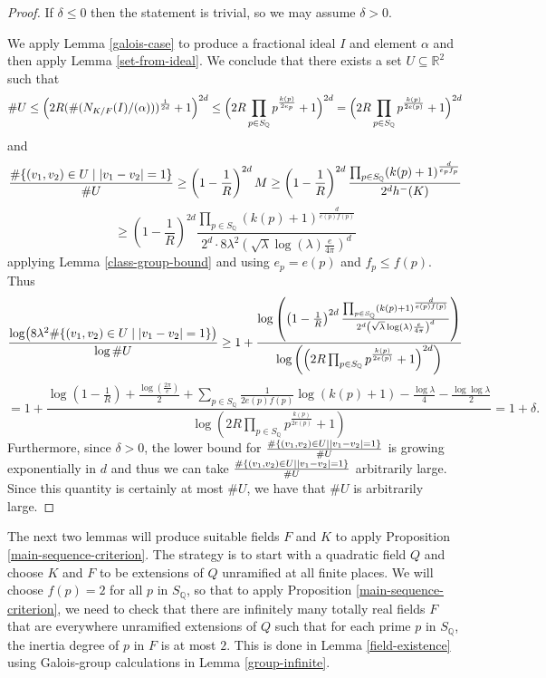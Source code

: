 \documentclass[12pt]{amsart}
\theoremstyle{remark}
\theoremstyle{definition}
\begin{document}
\begin{proof} If $\delta \leq 0$ then the statement is trivial, so we may assume $\delta>0$.

We apply Lemma \ref{galois-case} to produce a fractional ideal $I$ and element $\alpha$ and then apply Lemma \ref{set-from-ideal}. We conclude that there exists a set $U \subseteq \mathbb R^2$ such that \[\# U \leq  \left( 2R (\# (N_{K/F}(I)/(\alpha)))^{\frac{1}{2d}} +1 \right)^{2d} \leq \Bigl( 2R \prod_{p \in S_\mathbb Q} p^{\frac{k(p) }{2e_p}} +1 \Bigr)^{2d} = \Bigl( 2R \prod_{p \in S_\mathbb Q} p^{\frac{k(p) }{2e(p)}} +1 \Bigr)^{2d} \] and  \[  \frac{\# \{ (v_1,v_2) \in U \mid \abs{v_1-v_2}=1\} }{ \# U} \geq \left(1-\frac{1}{R}\right)^{2d} M  \geq \left(1-\frac{1}{R}\right)^{2d} \frac{ \prod_{ p \in S_\mathbb Q} (k(p)+1  )^{\frac{d}{ e_p f_p}}}{ 2^d h^{-}(K)} \] \[\geq \left(1-\frac{1}{R}\right)^{2d} \frac{ \prod_{ p \in S_\mathbb Q} (k(p)+1  )^{\frac{d}{ e(p) f(p)}}}{  2^d \cdot 8 \lambda^2 \left(\sqrt{\lambda  } \log(\lambda) \frac{e}{4\pi} \right)^d  }\] applying Lemma \ref{class-group-bound} and using $e_p=e(p)$ and $f_p \leq f(p)$. Thus
\[    \frac{  \log( 8\lambda^2  \# \{ (v_1,v_2) \in U \mid \abs{v_1-v_2}=1\})}{\log \#U} \geq 1 + \frac{\log\left(  \left(1-\frac{1}{R}\right)^{2d} \frac{ \prod_{ p \in S_\mathbb Q} (k(p)+1  )^{\frac{d}{ e(p) f(p)}}}{ 2^d \left(\sqrt{\lambda} \log(\lambda) \frac{e}{4\pi} \right)^d }  \right)}{\log \left( \left( 2R \prod_{p \in S_\mathbb Q} p^{\frac{k(p) }{2e(p)}} +1 \right)^{2d}\right)}\]
\[ = 1 + \frac{  \log \left(1-\frac{1}{R}\right) + \frac{\log \left(\frac{2\pi}{e} \right)}{2} +\sum_{p\in S_{\mathbb Q}} \frac{1}{2e(p)f(p) } \log (k(p)+1)  - \frac{\log \lambda}{4} - \frac{\log \log \lambda}{2} }{ \log \left( 2R \prod_{p \in S_\mathbb Q} p^{\frac{k(p) }{2e(p)}} +1 \right)} = 1+\delta.\]
Furthermore, since $\delta>0$, the lower bound for  $  \frac{\# \{ (v_1,v_2) \in U \mid \abs{v_1-v_2}=1\} }{ \# U} $ is growing exponentially in $d$ and thus we can take $  \frac{\# \{ (v_1,v_2) \in U \mid \abs{v_1-v_2}=1\} }{ \# U} $ arbitrarily large. Since this quantity is certainly at most $\#U$, we have that $\#U$ is arbitrarily large. \end{proof}


The next two lemmas will produce suitable fields $F$ and $K$ to apply Proposition \ref{main-sequence-criterion}. The strategy is to start with a quadratic field $Q$ and choose $K$ and $F$ to be extensions of $Q$ unramified at all finite places. We will choose $f(p)=2$ for all $p$ in $S_\mathbb Q$, so that to apply Proposition \ref{main-sequence-criterion}, we need to check that there are infinitely many totally real fields $F$ that are everywhere unramified extensions of $Q$ such that for each prime $p$ in $S_{\mathbb Q}$, the inertia degree of $p$ in $F$ is at most $2$.  This is done in Lemma \ref{field-existence} using Galois-group calculations in Lemma \ref{group-infinite}.
\end{document}
